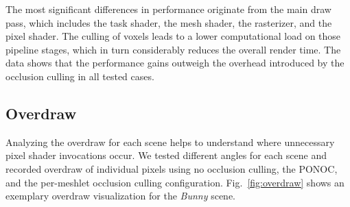 \documentclass[conference]{IEEEtran}
\begin{document}
\noindent
The most significant differences in performance originate from the main draw pass, which includes the task shader, 
the mesh shader, the rasterizer, and the pixel shader. The culling of voxels leads to a lower computational 
load on those pipeline stages, which in turn considerably reduces the overall render time. The data shows that the 
performance gains outweigh the overhead introduced by the occlusion culling in all tested cases.  

\subsection{Overdraw} \label{subsec-overdraw}

\noindent
Analyzing the overdraw for each scene helps to understand where unnecessary pixel shader 
invocations occur. We tested different angles for each scene and recorded overdraw of individual 
pixels using no occlusion culling, the \ac{PONOC}, and the per-meshlet occlusion 
culling configuration. Fig.~\ref{fig:overdraw} shows an exemplary overdraw visualization for the 
\emph{Bunny} scene. \\
\end{document}

